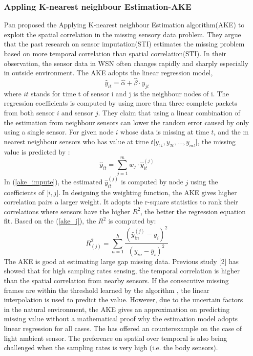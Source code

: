  \subsubsection{Appling K-nearest neighbour Estimation-AKE }
Pan proposed the Applying K-nearest neighbour Estimation algorithm(AKE)\cite{pan:ake} to exploit the spatial correlation in the missing sensory data problem. They argue that the past research on sensor imputation(STI) estimates the missing problem based on more temporal correlation than spatial correlation(STI). In their observation, the sensor data in WSN often changes rapidly and sharply especially in outside environment. The AKE adopts the linear regression model,
\begin{equation}
\hat{y}_{it} =\hat{\alpha} +\hat{\beta}\cdot y_{jt}
\label{ake_j}
\end{equation}
 where $it$ stands for time t of sensor i and j is the neighbour nodes of i. The regression coefficients is computed by using more than three complete packets from both sensor $i$ and sensor $j$. They claim that using a linear combination of the estimation from neighbour sensors can lower the random error caused by only using a single sensor. For given node $i$ whose data is missing at time $t$, and the m nearest neighbour sensors who has value at time $t$[$y_{1t}, y_{2t},\dots, y_{mt}$], the missing value is predicted by :   
 \begin{equation}
 \hat{y}_{it} =\sum_{j=1}^m w_j \cdot \hat{y}_{it}^{(j)}
 \label{ake_impute}
 \end{equation}
%
In (\ref{ake_impute}), the estimated $\hat{y}_{it}^(j)$ is computed by node $j$ using the coefficients of [$i,j$]. In designing the weighting function, the AKE gives higher correlation pairs a larger weight. It adopts the r-square statistics to rank their correlations where sensors have the higher $R^2$, the better the regression equation fit. Based on the (\ref{ake_j}), the $R^2$ is computed by:
\begin{equation}
R_(j)^2 = \sum_{n=1}^{h} \frac{(\hat{y}_{in}^(j)-\bar{y}_i)^2}{(y_{in}-\bar{y}_i)^2}
\end{equation}
The AKE is good at estimating large gap missing data. Previous study [2] has showed that for high sampling rates sensing, the temporal correlation is higher than the spatial correlation from nearby sensors. If the consecutive missing frames are within the threshold learned by the algorithm , the linear interpolation is used to predict the value. However, due to the uncertain factors in the natural environment, the AKE gives an approximation on predicting missing value without a mathematical proof why the estimation model adopts linear regression for all cases. The \cite{LI:DESM} has offered an counterexample on the case of light ambient sensor. The preference on spatial over temporal is also being challenged when the sampling rates is very high (i.e. the body sensors).   
